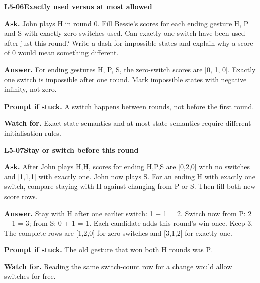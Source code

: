 \documentclass[11pt,a4paper]{article}
\begin{document}
\noindent\begin{minipage}{\textwidth}
{\color{teal}\textbf{L5-06}}\quad \textbf{Exactly used versus at most allowed}\par\smallskip
\textbf{Ask.} John plays H in round 0. Fill Bessie's scores for each ending gesture H, P and S with exactly zero switches used. Can exactly one switch have been used after just this round? Write a dash for impossible states and explain why a score of 0 would mean something different.\par\smallskip
\textbf{Answer.} For ending gestures H, P, S, the zero-switch scores are [0, 1, 0]. Exactly one switch is impossible after one round. Mark impossible states with negative infinity, not zero.\par\smallskip
\textbf{Prompt if stuck.} A switch happens between rounds, not before the first round.\par\smallskip
\textbf{Watch for.} Exact-state semantics and at-most-state semantics require different initialisation rules.
\end{minipage}\par{}\medskip

\noindent\begin{minipage}{\textwidth}
{\color{teal}\textbf{L5-07}}\quad \textbf{Stay or switch before this round}\par\smallskip
\textbf{Ask.} After John plays H,H, scores for ending H,P,S are [0,2,0] with no switches and [1,1,1] with exactly one. John now plays S. For an ending H with exactly one switch, compare staying with H against changing from P or S. Then fill both new score rows.\par\smallskip
\textbf{Answer.} Stay with H after one earlier switch: 1 + 1 = 2. Switch now from P: 2 + 1 = 3; from S: 0 + 1 = 1. Each candidate adds this round's win once. Keep 3. The complete rows are [1,2,0] for zero switches and [3,1,2] for exactly one.\par\smallskip
\textbf{Prompt if stuck.} The old gesture that won both H rounds was P.\par\smallskip
\textbf{Watch for.} Reading the same switch-count row for a change would allow switches for free.
\end{minipage}\par{}\medskip
\end{document}
